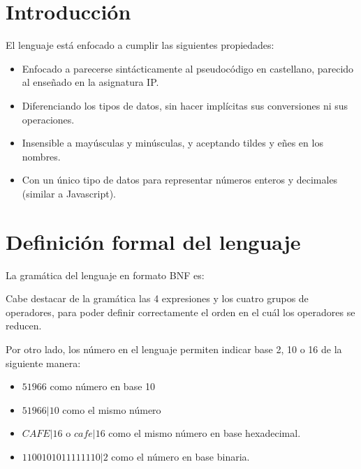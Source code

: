 \documentclass{report}
\begin{document}
\section{Introducción}
El lenguaje está enfocado a cumplir las siguientes propiedades:

\begin{itemize}
	\item Enfocado a parecerse sintácticamente al pseudocódigo en castellano, parecido al enseñado en la asignatura IP.
	\item Diferenciando los tipos de datos, sin hacer implícitas sus conversiones ni sus operaciones.
	\item Insensible a mayúsculas y minúsculas, 
	y aceptando tildes y eñes en los nombres.
	\item Con un único tipo de datos para representar números enteros y decimales (similar a Javascript).
\end{itemize}

\section{Definición formal del lenguaje}
La gramática del lenguaje en formato BNF es:


Cabe destacar de la gramática las 4 expresiones y los cuatro grupos de operadores, para poder definir correctamente el orden en el cuál los operadores se reducen.

Por otro lado, los número en el lenguaje permiten indicar base 2, 10 o 16 de la siguiente manera:

\begin{itemize}
	\item $51966$ como número en base 10
	\item $51966|10$ como el mismo número
	\item $CAFE|16$ o $cafe|16$ como el mismo número en base hexadecimal.
	\item $1100101011111110|2$ como el número en base binaria.
\end{itemize}
\end{document}
